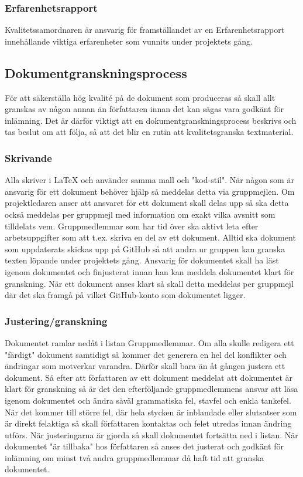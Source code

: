 \subsubsection{Erfarenhetsrapport}
Kvalitetssamordnaren är ansvarig för framställandet av en Erfarenhetsrapport innehållande viktiga erfarenheter som vunnits under projektets gång.

\subsection{Dokumentgranskningsprocess}
För att säkerställa hög kvalité på de dokument som produceras så skall allt granskas av någon annan än författaren innan det kan sägas vara godkänt för inlämning. Det är därför viktigt att en dokumentgranskningsprocess beskrivs och tas beslut om att följa, så att det blir en rutin att kvalitetsgranska textmaterial.

\subsubsection{Skrivande}
Alla skriver i LaTeX och använder samma mall och "kod-stil". När någon som är ansvarig för ett dokument behöver hjälp så meddelas detta via gruppmejlen. Om projektledaren anser att ansvaret för ett dokument skall delas upp så ska detta också meddelas per gruppmejl med information om exakt vilka avsnitt som tilldelats vem. Gruppmedlemmar som har tid över ska aktivt leta efter arbetsuppgifter som att t.ex. skriva en del av ett dokument. Alltid ska dokument som uppdaterats skickas upp på GitHub så att andra ur gruppen kan granska texten löpande under projektets gång. Ansvarig för dokumentet skall ha läst igenom dokumentet och finjusterat innan han kan meddela dokumentet klart för granskning. När ett dokument anses klart så skall detta meddelas per gruppmejl där det ska framgå på vilket GitHub-konto som dokumentet ligger.

\subsubsection{Justering/granskning}
Dokumentet ramlar nedåt i listan Gruppmedlemmar. Om alla skulle redigera ett "färdigt" dokument samtidigt så kommer det generera en hel del konflikter och ändringar som motverkar varandra. Därför skall bara än åt gången justera ett dokument. Så efter att författaren av ett dokument meddelat att dokumentet är klart för granskning så är det den efterföljande gruppmedlemmens ansvar att läsa igenom dokumentet och ändra såväl grammatiska fel, stavfel och enkla tankefel. När det kommer till större fel, där hela stycken är inblandade eller slutsatser som är direkt felaktiga så skall författaren kontaktas och felet utredas innan ändring utförs. När justeringarna är gjorda så skall dokumentet fortsätta ned i listan. När dokumentet "är tillbaka" hos författaren så anses det justerat och godkänt för inlämning om minst två andra gruppmedlemmar då haft tid att granska dokumentet.

